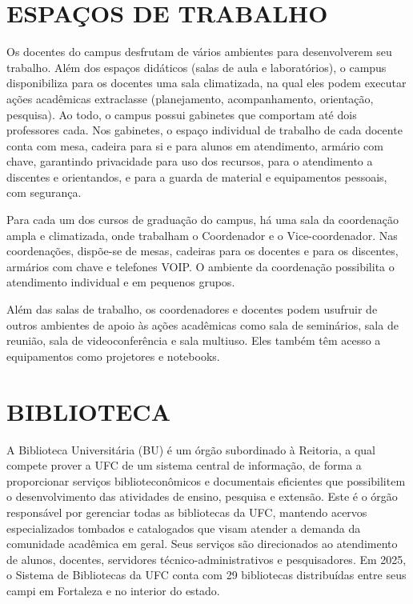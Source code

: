 \section{ESPAÇOS DE TRABALHO}

Os docentes do campus desfrutam de vários ambientes para desenvolverem seu trabalho. Além dos espaços didáticos (salas de aula e laboratórios), o campus disponibiliza para os docentes uma sala climatizada, na qual eles podem executar ações acadêmicas extraclasse (planejamento, acompanhamento, orientação, pesquisa). Ao todo, o campus possui \ufcNumGabinetes gabinetes que comportam até dois professores cada. Nos gabinetes, o espaço individual de trabalho de cada docente conta com mesa, cadeira para si e para alunos em atendimento, armário com chave, garantindo privacidade para uso dos recursos, para o atendimento a discentes e orientandos, e para a guarda de material e equipamentos pessoais, com segurança.

Para cada um dos cursos de graduação do campus, há uma sala da coordenação ampla e climatizada, onde trabalham o Coordenador e o Vice-coordenador. Nas coordenações, dispõe-se de mesas, cadeiras para os docentes e para os discentes, armários com chave e telefones VOIP. O ambiente da coordenação possibilita o atendimento individual e em pequenos grupos.

Além das salas de trabalho, os coordenadores e docentes podem usufruir de outros ambientes de apoio às ações acadêmicas como sala de seminários, sala de reunião, sala de videoconferência e sala multiuso. Eles também têm acesso a equipamentos como projetores e notebooks.

\section{BIBLIOTECA}
\label{sec:biblioteca}

A Biblioteca Universitária (BU) é um órgão subordinado à Reitoria, a qual compete prover a UFC de um sistema central de informação, de forma a proporcionar serviços biblioteconômicos e documentais eficientes que possibilitem o desenvolvimento das atividades de ensino, pesquisa e extensão. Este é o órgão responsável por gerenciar todas as bibliotecas da UFC, mantendo acervos especializados tombados e catalogados que visam atender a demanda da comunidade acadêmica em geral. Seus serviços são direcionados ao atendimento de alunos, docentes, servidores técnico-administrativos e pesquisadores. Em 2025, o Sistema de Bibliotecas da UFC conta com 29 bibliotecas distribuídas entre seus campi em Fortaleza e no interior do estado.

